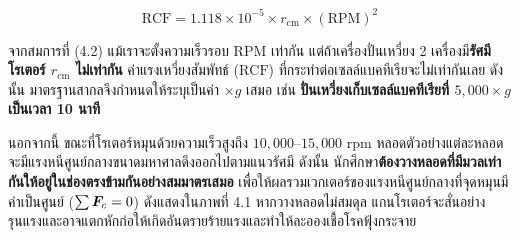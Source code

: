 \begin{equation}
    \text{RCF} = 1.118 \times 10^{-5} \times r_{\text{cm}} \times (\text{RPM})^2
\end{equation}

\begin{conceptbox}
จากสมการที่ (4.2) แม้เราจะตั้งความเร็วรอบ $\text{RPM}$ เท่ากัน แต่ถ้าเครื่องปั่นเหวี่ยง 2 เครื่องมี\textbf{รัศมีโรเตอร์ $r_{\text{cm}}$ ไม่เท่ากัน} ค่าแรงเหวี่ยงสัมพัทธ์ ($\text{RCF}$) ที่กระทำต่อเซลล์แบคทีเรียจะไม่เท่ากันเลย ดังนั้น มาตรฐานสากลจึงกำหนดให้ระบุเป็นค่า $\times g$ เสมอ เช่น \textbf{ปั่นเหวี่ยงเก็บเซลล์แบคทีเรียที่ $5{,}000 \times g$ เป็นเวลา 10 นาที}
\end{conceptbox}

นอกจากนี้ ขณะที่โรเตอร์หมุนด้วยความเร็วสูงถึง $10{,}000\text{--}15{,}000\text{ rpm}$ หลอดตัวอย่างแต่ละหลอดจะมีแรงหนีศูนย์กลางขนาดมหาศาลดึงออกไปตามแนวรัศมี ดังนั้น นักศึกษา\textbf{ต้องวางหลอดที่มีมวลเท่ากันให้อยู่ในช่องตรงข้ามกันอย่างสมมาตรเสมอ} เพื่อให้ผลรวมเวกเตอร์ของแรงหนีศูนย์กลางที่จุดหมุนมีค่าเป็นศูนย์ ($\sum \bm{F}_c = 0$) ดังแสดงใน\mbox{ภาพที่} 4.1 หากวางหลอดไม่สมดุล แกนโรเตอร์จะสั่นอย่างรุนแรงและอาจแตกหักก่อให้เกิดอันตรายร้ายแรงและทำให้ละอองเชื้อโรคฟุ้งกระจาย

